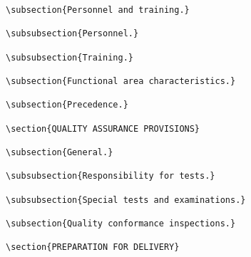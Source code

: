 \begin{itemize}
\begin{small}
\begin{verbatim}
\subsection{Personnel and training.}

\subsubsection{Personnel.}

\subsubsection{Training.}

\subsection{Functional area characteristics.}

\subsection{Precedence.}

\section{QUALITY ASSURANCE PROVISIONS}

\subsection{General.}

\subsubsection{Responsibility for tests.}

\subsubsection{Special tests and examinations.}

\subsection{Quality conformance inspections.}

\section{PREPARATION FOR DELIVERY}


\end{verbatim}
\end{small}
\end{itemize}
